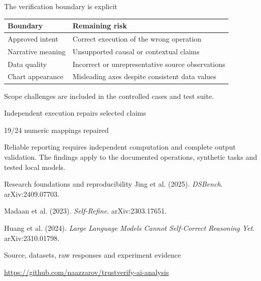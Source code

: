 \documentclass[aspectratio=169,11pt]{beamer}
\newcommand{\source}[1]{\vfill{\tiny\color{Muted}#1}}
\begin{document}
\begin{frame}{The verification boundary is explicit}
\begin{tabular}{lp{}}\toprule Boundary & Remaining risk\\\midrule
Approved intent & Correct execution of the wrong operation\\[3mm]
Narrative meaning & Unsupported causal or contextual claims\\[3mm]
Data quality & Incorrect or unrepresentative source observations\\[3mm]
Chart appearance & Misleading axes despite consistent data values\\\bottomrule\end{tabular}
\source{Scope challenges are included in the controlled cases and test suite.}
\end{frame}
\begin{frame}{Independent execution repairs selected claims}
\par\vspace{8mm}
{\LARGE\color{Cobalt}19/24 numeric mappings repaired}\par\vspace{10mm}
Reliable reporting requires independent computation and complete output validation.
\source{The findings apply to the documented operations, synthetic tasks and tested local models.}
\end{frame}
\begin{frame}{Research foundations and reproducibility}
\small
Jing et al. (2025). \textit{DSBench}. arXiv:2409.07703.\par\vspace{3mm}
Madaan et al. (2023). \textit{Self-Refine}. arXiv:2303.17651.\par\vspace{3mm}
Huang et al. (2024). \textit{Large Language Models Cannot Self-Correct Reasoning Yet}. arXiv:2310.01798.\par\vspace{9mm}
\normalsize\color{Cobalt}Source, datasets, raw responses and experiment evidence\par\vspace{3mm}
\small\url{https://github.com/naazzarov/trustverify-ai-analysis}
\end{frame}
\end{document}
